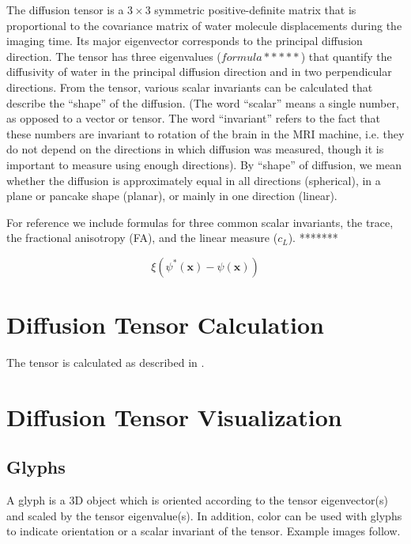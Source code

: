 \documentclass{InsightArticle}
\begin{document}
The diffusion tensor is a $3 \times 3$ symmetric positive-definite
matrix that is proportional to the covariance matrix of water molecule
displacements during the imaging time.  Its major eigenvector
corresponds to the principal diffusion direction.  The tensor has
three eigenvalues ($formula ***** $) that quantify the diffusivity of water
in the principal diffusion direction and in two perpendicular
directions. From the tensor, various scalar invariants can be
calculated that describe the ``shape'' of the diffusion.  (The word
``scalar'' means a single number, as opposed to a vector or tensor.
The word ``invariant'' refers to the fact that these numbers are
invariant to rotation of the brain in the MRI machine, i.e. they do
not depend on the directions in which diffusion was measured, though
it is important to measure using enough directions).  By ``shape'' of
diffusion, we mean whether the diffusion is approximately equal in all
directions (spherical), in a plane or pancake shape (planar), or
mainly in one direction (linear).

For reference we include formulas for three common scalar invariants,
the trace, the fractional anisotropy (FA), and the linear measure
($c_L$). *******
%
%


\begin{equation}
\label{eqn:ShapeInfluenceTerm}
\xi \left(\psi^{*}(\mathbf{x}) - \psi(\mathbf{x})\right)
\end{equation}



\section{Diffusion Tensor Calculation}
The tensor is calculated as described in \cite{}.


\section{Diffusion Tensor Visualization}

\subsection{Glyphs}
A glyph is a 3D object which is oriented according to the tensor
eigenvector(s) and scaled by the tensor eigenvalue(s).  In addition,
color can be used with glyphs to indicate orientation or a scalar
invariant of the tensor.  Example images follow.
\end{document}
